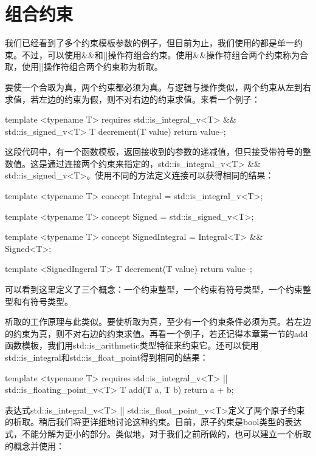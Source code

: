 \section{组合约束}

我们已经看到了多个约束模板参数的例子，但目前为止，我们使用的都是单一约束。不过，可以使用\&\&和||操作符组合约束。使用\&\&操作符组合两个约束称为合取，使用||操作符组合两个约束称为析取。

要使一个合取为真，两个约束都必须为真。与逻辑与操作类似，两个约束从左到右求值，若左边的约束为假，则不对右边的约束求值。来看一个例子：

\begin{cpp}
template <typename T>
requires std::is_integral_v<T> && std::is_signed_v<T>
T decrement(T value)
{
	return value--;
}
\end{cpp}

这段代码中，有一个函数模板，返回接收到的参数的递减值，但只接受带符号的整数值。这是通过连接两个约束来指定的，std::is\_integral\_v<T> \&\& std::is\_signed\_v<T>。使用不同的方法定义连接可以获得相同的结果：

\begin{cpp}
template <typename T>
concept Integral = std::is_integral_v<T>;

template <typename T>
concept Signed = std::is_signed_v<T>;

template <typename T>
concept SignedIntegral = Integral<T> && Signed<T>;

template <SignedIngeral T>
T decrement(T value)
{
	return value--;
}
\end{cpp}

可以看到这里定义了三个概念：一个约束整型，一个约束有符号类型，一个约束整型和有符号类型。

析取的工作原理与此类似。要使析取为真，至少有一个约束条件必须为真。若左边的约束为真，则不对右边的约束求值。再看一个例子，若还记得本章第一节的add函数模板，我们用std::is\_arithmetic类型特征来约束它。还可以使用std::is\_integral和std::is\_float\_point得到相同的结果：

\begin{cpp}
template <typename T>
requires std::is_integral_v<T> || std::is_floating_point_v<T>
T add(T a, T b)
{
	return a + b;
}
\end{cpp}

表达式std::is\_integral\_v<T> || std::is\_float\_point\_v<T>定义了两个原子约束的析取。稍后我们将更详细地讨论这种约束。目前，原子约束是bool类型的表达式，不能分解为更小的部分。类似地，对于我们之前所做的，也可以建立一个析取的概念并使用：

